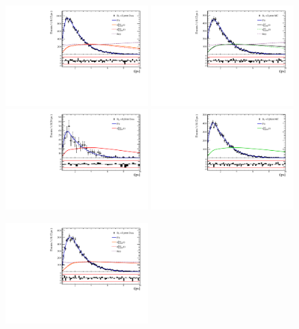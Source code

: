 \clearpage
\begin{figure}[h]
\includegraphics[height=!,width=0.49\textwidth]{figs/Acceptance/adaptive_N4/timeAccRatioFit_norm_Run1_t0.pdf}
\includegraphics[height=!,width=0.49\textwidth]{figs/Acceptance/adaptive_N4/timeAccRatioFit_norm_mc_Run1_t0.pdf}
\includegraphics[height=!,width=0.49\textwidth]{figs/Acceptance/adaptive_N4/timeAccRatioFit_signal_B0_Run1_t0.pdf}
\includegraphics[height=!,width=0.49\textwidth]{figs/Acceptance/adaptive_N4/timeAccRatioFit_signal_mc_Run1_t0.pdf}
\caption{}
\label{fig:}
\includegraphics[height=!,width=0.49\textwidth]{figs/Acceptance/adaptive_N4/timeAccRatioFit_norm_Run1_t1.pdf}

\end{figure}
